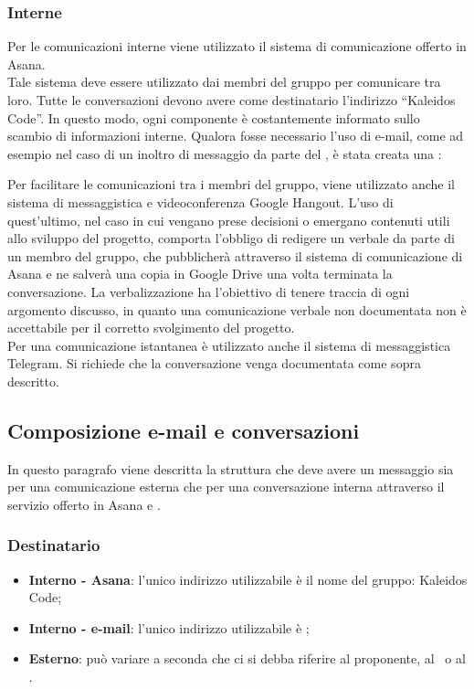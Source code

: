 \documentclass[../NormeDiProgetto.tex]{subfiles}
\begin{document}
			\subsubsection{Interne}
				Per le comunicazioni interne viene utilizzato il sistema di
				comunicazione offerto in Asana.\\
				Tale sistema deve essere utilizzato dai membri del gruppo
				per comunicare tra loro. Tutte le conversazioni devono avere
				come destinatario l'indirizzo ``Kaleidos Code''.
				In questo modo, ogni componente è costantemente informato sullo
				scambio di informazioni interne.
				Qualora fosse necessario l'uso di e-mail, come ad esempio nel caso di
				un inoltro di messaggio da parte del \responsabilediprogetto, è stata creata una :
				\begin{center}
					\mailinglist
				\end{center}
				Per facilitare le comunicazioni tra i membri del gruppo, viene
				utilizzato anche il sistema di messaggistica e videoconferenza
				Google Hangout.
				L'uso di quest'ultimo, nel caso in cui
				vengano prese decisioni	o emergano contenuti utili allo
				sviluppo del progetto, comporta l'obbligo di redigere un verbale
				da parte di un membro del gruppo, che pubblicherà attraverso il sistema
				di comunicazione di Asana e ne salverà una copia in Google Drive una volta
				terminata la conversazione. La verbalizzazione ha l'obiettivo di tenere
				traccia di ogni argomento discusso, in
				quanto una comunicazione verbale non documentata non è
				accettabile per il corretto svolgimento del progetto.\\
				Per una comunicazione istantanea è utilizzato anche il sistema
				di messaggistica Telegram. Si richiede che la conversazione
				venga documentata come sopra descritto.
			\subsection{Composizione e-mail e conversazioni}
				In questo paragrafo viene descritta la struttura che deve avere
				un messaggio sia per una comunicazione esterna che per una
				conversazione interna attraverso il servizio offerto in Asana e
				.
				\subsubsection{Destinatario}
					\begin{itemize}
						\item \textbf{Interno - Asana}: l'unico indirizzo utilizzabile è
						il nome del gruppo: Kaleidos Code;
						\item \textbf{Interno - e-mail}: l'unico indirizzo utilizzabile è
						\mailkaleidoscode;
						\item \textbf{Esterno}: può variare a seconda che ci si debba
						riferire  al proponente, al \vardanega\ o al \cardin.
					\end{itemize}
\end{document}
